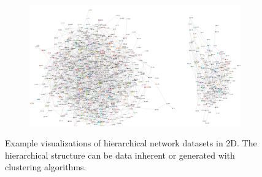 \begin{figure}[h]
\begin{subfigure}[b]{0.5\columnwidth}
      \label{fig:original2DdiseaseNet}
    \end{subfigure}
    \begin{subfigure}[b]{0.7\columnwidth}
      \centering
      \includegraphics[width=\textwidth]{graphics/classic2DGraph.png}
      \label{fig:2dHierarchicalClutter}
    \end{subfigure}
    \caption[Visualizations of hierarchical network datasets.]{Example visualizations of hierarchical network datasets in 2D. The hierarchical structure can be data inherent or generated with clustering algorithms.}
    \label{fig:intro} 
  \end{figure}

